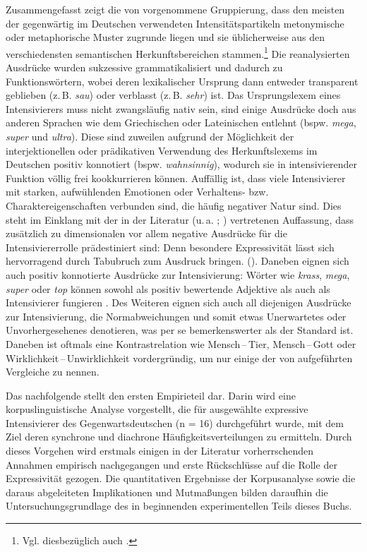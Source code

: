 
\noindent Zusammengefasst zeigt die von \citet[]{Claudi.2006} vorgenommene Gruppierung, dass den meisten der gegenwärtig im Deutschen verwendeten Intensitätspartikeln metonymische oder metaphorische Muster zugrunde liegen und sie üblicherweise aus den verschiedensten semantischen Herkunftsbereichen stammen.\footnote{Vgl. diesbezüglich auch \citet[]{Kirschbaum.2002b, Kirschbaum.2002a}.} Die reanalysierten Ausdrücke wurden sukzessive grammatikalisiert und dadurch zu Funktionswörtern, wobei deren lexikalischer Ursprung dann entweder transparent geblieben (z.\,B. \textit{sau}) oder verblasst (z.\,B. \textit{sehr}) ist. Das Ursprungslexem eines Intensivierers muss nicht zwangsläufig nativ sein, sind einige Ausdrücke doch aus anderen Sprachen wie dem Griechischen oder Lateinischen entlehnt (bspw. \textit{mega}, \textit{super} und \textit{ultra}). Diese sind zuweilen aufgrund der Möglichkeit der interjektionellen oder prädikativen Verwendung des Herkunftslexems im Deutschen positiv konnotiert (bspw. \textit{wahnsinnig}), wodurch sie in intensivierender Funktion völlig frei kookkurrieren können. Auffällig ist, dass viele Intensivierer mit starken, aufwühlenden Emotionen oder Verhaltens- bzw. Charaktereigenschaften verbunden sind, die häufig negativer Natur sind. Dies steht im Einklang mit der in der Literatur (u.\,a.
{\citealt[165ff.]{Biedermann.1969}}; \citealt[]{Hentschel.1998b}) vertretenen Auffassung, dass zusätzlich zu dimensionalen vor allem negative Ausdrücke für die Intensiviererrolle prädestiniert sind: \glqq{}Denn besondere Expressivität lässt sich hervorragend durch Tabubruch zum Ausdruck bringen.\grqq{} ({\citealt[2]{Keller.2003}}). Daneben eignen sich auch positiv konnotierte Ausdrücke zur Intensivierung: Wörter wie \textit{krass}, \textit{mega}, \textit{super} oder \textit{top} können sowohl als positiv bewertende Adjektive als auch als Intensivierer fungieren {\citep[vgl.][]{Stratton.2022b}}. Des Weiteren eignen sich auch all diejenigen Ausdrücke zur Intensivierung, die Normabweichungen und somit etwas Unerwartetes oder Unvorhergesehenes denotieren, was per se bemerkenswerter als der Standard ist. Daneben ist oftmals eine Kontrastrelation wie Mensch\,--\,Tier, Mensch\,--\,Gott oder Wirklichkeit\,--\,Unwirklichkeit vordergründig, um nur einige der von {\citet[161]{Claudi.2006}} aufgeführten Vergleiche zu nennen.

Das nachfolgende  stellt den ersten Empirieteil dar. Darin wird eine korpuslinguistische Analyse vorgestellt, die für ausgewählte expressive Intensivierer des Gegenwartsdeutschen (n = 16) durchgeführt wurde, mit dem Ziel deren synchrone und diachrone Häufigkeitsverteilungen zu ermitteln. Durch dieses Vorgehen wird erstmals einigen in der Literatur vorherrschenden Annahmen empirisch nachgegangen und erste Rückschlüsse auf die Rolle der Expressivität gezogen. Die quantitativen Ergebnisse der Korpusanalyse sowie die daraus abgeleiteten Implikationen und Mutmaßungen bilden daraufhin die Untersuchungsgrundlage des in {} beginnenden experimentellen Teils dieses Buchs.







